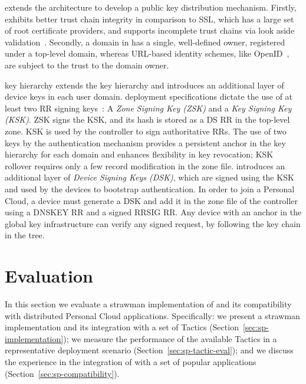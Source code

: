 \signpost extends the \dnssec architecture to develop a public key
distribution mechanism.  Firstly, \dnssec exhibits better trust chain integrity
in comparison to SSL, which has a large set of root certificate providers, and
supports incomplete trust chains via look aside validation~.
Secondly, a domain in \dnssec has a single, well-defined owner, registered under
a top-level domain, whereas URL-based identity schemes, like
OpenID~, are subject to the trust to the domain owner.

\signpost key hierarchy extends the \dnssec key hierarchy and introduces an
additional layer of device keys in each user domain. \dnssec deployment
specifications dictate the use of at least two RR signing
keys~: A \textit{Zone Signing Key (ZSK)} and a \textit{Key
Signing Key (KSK)}.  ZSK signs the KSK, and its hash is stored as a DS RR in
the top-level zone. KSK is used by the controller to sign authoritative RRs\@.
The use of two keys by the authentication mechanism provides a persistent
anchor in the \dnssec key hierarchy for each domain and enhances flexibility in
key revocation; KSK rollover requires only a few record modification in the
zone file.  \signpost introduces an additional layer of \textit{Device Signing
Keys (DSK)}, which are signed using the KSK and used by the devices to
bootstrap authentication.  In order to join a Personal Cloud, a device must
generate a DSK and add it in the zone file of the \signpost controller using a
DNSKEY RR and a signed RRSIG RR\@. Any device with an anchor in the global
\dnssec key infrastructure can verify any \signpost signed request, by
following the key chain in the \dnssec tree.

\section{Evaluation}\label{sec:signpost-evaluation}

In this section we evaluate a strawman implementation of \signpost and its
compatibility with distributed Personal Cloud applications.  Specifically: we
present a strawman \signpost implementation and its integration with a set of
Tactics (Section~\ref{sec:sp-implementation}); we measure the performance of
the available \signpost Tactics in a representative deployment scenario
(Section~\ref{sec:sp-tactic-eval}); and we discuss the experience in the
integration of \signpost with a set of popular applications
(Section~\ref{sec:sp-compatibility}). 

